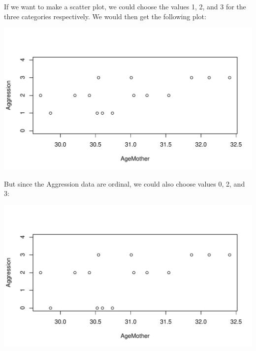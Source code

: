 \documentclass[]{report}\usepackage[]{graphicx}\usepackage[]{color}
\makeatletter
\def\maxwidth{ %
  \ifdim\Gin@nat@width>\linewidth
    \linewidth
  \else
    \Gin@nat@width
  \fi
}
\newenvironment{knitrout}{}{} %
\makeatother
\begin{document}
If we want to make a scatter plot, we could choose the values 1, 2, and 3 for the three categories respectively. We would then get the following plot:


\begin{knitrout}
\color{fgcolor}

{\centering \includegraphics[width=\maxwidth]{figure/fig101-1} 

}



\end{knitrout}

But since the Aggression data are ordinal, we could also choose values 0, 2, and 3:

\begin{knitrout}
\color{fgcolor}

{\centering \includegraphics[width=\maxwidth]{figure/fig1114-1} 

}



\end{knitrout}
\end{document}
